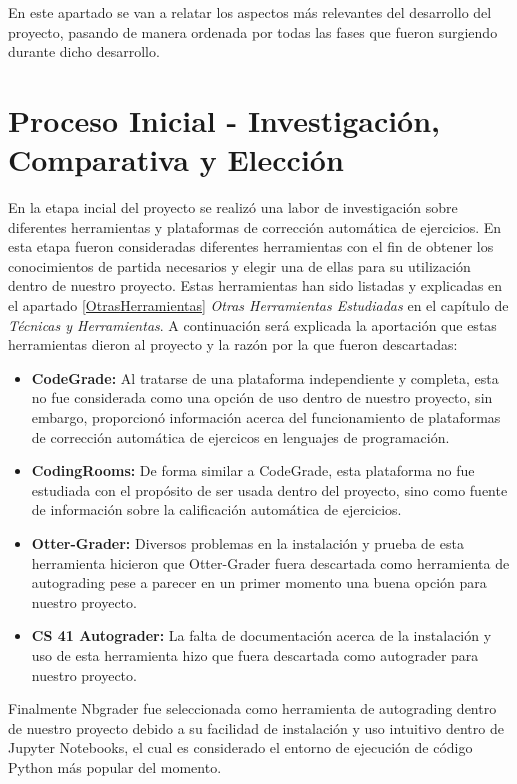 
En este apartado se van a relatar los aspectos más relevantes del desarrollo del proyecto, pasando de manera ordenada por todas las fases que fueron surgiendo durante dicho desarrollo.

\section{Proceso Inicial - Investigación, Comparativa y Elección}

En la etapa incial del proyecto se realizó una labor de investigación sobre diferentes herramientas y plataformas de corrección automática de ejercicios. En esta etapa fueron consideradas diferentes herramientas con el fin de obtener los conocimientos de partida necesarios y elegir una de ellas para su utilización dentro de nuestro proyecto. Estas herramientas han sido listadas y explicadas en el apartado \ref{OtrasHerramientas} \textit{Otras Herramientas Estudiadas} en el capítulo de \textit{Técnicas y Herramientas}. A continuación será explicada la aportación que estas herramientas dieron al proyecto y la razón por la que fueron descartadas:

\begin{itemize}
\item \textbf{CodeGrade:} Al tratarse de una plataforma independiente y completa, esta no fue considerada como una opción de uso dentro de nuestro proyecto, sin embargo, proporcionó información acerca del funcionamiento de plataformas de corrección automática de ejercicos en lenguajes de programación.

\item \textbf{CodingRooms:} De forma similar a CodeGrade, esta plataforma no fue estudiada con el propósito de ser usada dentro del proyecto, sino como fuente de información sobre la calificación automática de ejercicios.


\item \textbf{Otter-Grader:} Diversos problemas en la instalación y prueba de esta herramienta hicieron que Otter-Grader fuera descartada como herramienta de autograding pese a parecer en un primer momento una buena opción para nuestro proyecto.

\item \textbf{CS 41 Autograder:} La falta de documentación acerca de la instalación y uso de esta herramienta hizo que fuera descartada como autograder para nuestro proyecto.

\end{itemize}
Finalmente Nbgrader fue seleccionada como herramienta de autograding dentro de nuestro proyecto debido a su facilidad de instalación y uso intuitivo dentro de Jupyter Notebooks, el cual es considerado el entorno de ejecución de código Python más popular del momento.


